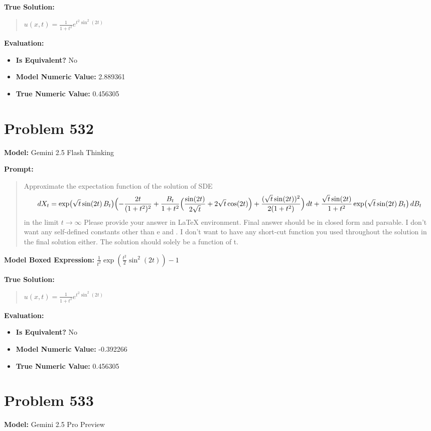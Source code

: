 \documentclass{article}
\begin{document}
\textbf{True Solution:}
\begin{quote}
$u(x,t) = \frac{1}{1 + t^2} e^{t^2 \sin^2(2t)}$
\end{quote}

\textbf{Evaluation:}
\begin{itemize}
\item \textbf{Is Equivalent?} No
\item \textbf{Model Numeric Value:} 2.889361
\item \textbf{True Numeric Value:} 0.456305
\end{itemize}
\vspace{1cm}
\section*{Problem 532}
\textbf{Model:} Gemini 2.5 Flash Thinking

\textbf{Prompt:}
\begin{quote}
Approximate the expectation function of the solution of SDE $$dX_t=\exp\bigl(\sqrt{t}\sin(2t)\,B_t\bigr)\Bigl(-\frac{2t}{(1+t^2)^2}+\frac{B_t}{1+t^2}\Bigl(\frac{\sin(2t)}{2\sqrt{t}}+2\sqrt{t}\cos(2t)\Bigr)+\frac{(\sqrt{t}\sin(2t))^2}{2(1+t^2)}\Bigr)\,dt+\frac{\sqrt{t}\sin(2t)}{1+t^2}\exp\bigl(\sqrt{t}\sin(2t)\,B_t\bigr)\,dB_t$$ in the limit $t \to \infty$ Please provide your answer in LaTeX \boxed{} environment. Final answer should be in closed form and parsable. I don't want any self-defined constants other than e and \pi. I don't want to have any short-cut function you used throughout the solution in the final solution either. The solution should solely be a function of t.
\end{quote}
\textbf{Model Boxed Expression:} $\frac{1}{t^2}\exp\left(\frac{t^2}{2}\sin^2(2t)\right)-1$

\textbf{True Solution:}
\begin{quote}
$u(x,t) = \frac{1}{1 + t^2} e^{t^2 \sin^2(2t)}$
\end{quote}

\textbf{Evaluation:}
\begin{itemize}
\item \textbf{Is Equivalent?} No
\item \textbf{Model Numeric Value:} -0.392266
\item \textbf{True Numeric Value:} 0.456305
\end{itemize}
\vspace{1cm}
\section*{Problem 533}
\textbf{Model:} Gemini 2.5 Pro Preview
\end{document}

